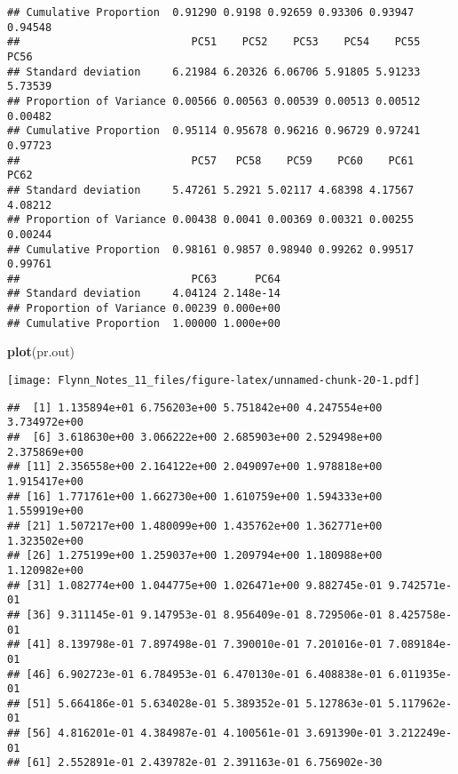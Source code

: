 \documentclass[]{article}
\newenvironment{Shaded}{\begin{snugshade}}{\end{snugshade}}
\newcommand{\KeywordTok}[1]{\textcolor[rgb]{0.13,0.29,0.53}{\textbf{#1}}}
\newcommand{\DecValTok}[1]{\textcolor[rgb]{0.00,0.00,0.81}{#1}}
\newcommand{\StringTok}[1]{\textcolor[rgb]{0.31,0.60,0.02}{#1}}
\newcommand{\OperatorTok}[1]{\textcolor[rgb]{0.81,0.36,0.00}{\textbf{#1}}}
\newcommand{\NormalTok}[1]{#1}
\begin{document}
\begin{verbatim}
## Cumulative Proportion  0.91290 0.9198 0.92659 0.93306 0.93947 0.94548
##                           PC51    PC52    PC53    PC54    PC55    PC56
## Standard deviation     6.21984 6.20326 6.06706 5.91805 5.91233 5.73539
## Proportion of Variance 0.00566 0.00563 0.00539 0.00513 0.00512 0.00482
## Cumulative Proportion  0.95114 0.95678 0.96216 0.96729 0.97241 0.97723
##                           PC57   PC58    PC59    PC60    PC61    PC62
## Standard deviation     5.47261 5.2921 5.02117 4.68398 4.17567 4.08212
## Proportion of Variance 0.00438 0.0041 0.00369 0.00321 0.00255 0.00244
## Cumulative Proportion  0.98161 0.9857 0.98940 0.99262 0.99517 0.99761
##                           PC63      PC64
## Standard deviation     4.04124 2.148e-14
## Proportion of Variance 0.00239 0.000e+00
## Cumulative Proportion  1.00000 1.000e+00
\end{verbatim}

\begin{Shaded}
\begin{Highlighting}[]
\KeywordTok{plot}\NormalTok{(pr.out)}
\end{Highlighting}
\end{Shaded}

\texttt{[image: Flynn\_Notes\_11\_files/figure-latex/unnamed-chunk-20-1.pdf]}

\begin{Shaded}
\end{Shaded}

\begin{verbatim}
##  [1] 1.135894e+01 6.756203e+00 5.751842e+00 4.247554e+00 3.734972e+00
##  [6] 3.618630e+00 3.066222e+00 2.685903e+00 2.529498e+00 2.375869e+00
## [11] 2.356558e+00 2.164122e+00 2.049097e+00 1.978818e+00 1.915417e+00
## [16] 1.771761e+00 1.662730e+00 1.610759e+00 1.594333e+00 1.559919e+00
## [21] 1.507217e+00 1.480099e+00 1.435762e+00 1.362771e+00 1.323502e+00
## [26] 1.275199e+00 1.259037e+00 1.209794e+00 1.180988e+00 1.120982e+00
## [31] 1.082774e+00 1.044775e+00 1.026471e+00 9.882745e-01 9.742571e-01
## [36] 9.311145e-01 9.147953e-01 8.956409e-01 8.729506e-01 8.425758e-01
## [41] 8.139798e-01 7.897498e-01 7.390010e-01 7.201016e-01 7.089184e-01
## [46] 6.902723e-01 6.784953e-01 6.470130e-01 6.408838e-01 6.011935e-01
## [51] 5.664186e-01 5.634028e-01 5.389352e-01 5.127863e-01 5.117962e-01
## [56] 4.816201e-01 4.384987e-01 4.100561e-01 3.691390e-01 3.212249e-01
## [61] 2.552891e-01 2.439782e-01 2.391163e-01 6.756902e-30
\end{verbatim}
\end{document}
